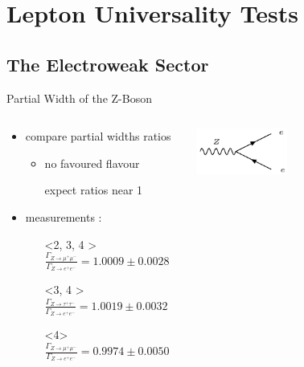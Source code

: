 \section{Lepton Universality Tests}
\subsection{The Electroweak Sector}
\frame{\tableofcontents[currentsection]}
    \begin{frame}{Partial Width of the Z-Boson}
        \begin{columns}
            \begin{column}{0.5\textwidth}
                \begin{itemize}
                    \item compare partial widths \rightarrow ratios
                    \begin{itemize}
                        \item no favoured flavour
                        \item [\rightarrow] expect ratios near 1
                    \end{itemize} 
                    \item measurements \footnotemark{} \footnotemark{} :
                    \begin{itemize}
                        \item [] <2, 3, 4 >$\frac{\Gamma_{Z \rightarrow \mu^+ \mu^-}}{\Gamma_{Z \rightarrow e^+ e^-}} = 1.0009 \pm 0.0028$
                        \item  []
                        \item [] <3, 4 > $\frac{\Gamma_{Z \rightarrow \tau^+ \tau^-}}{\Gamma_{Z \rightarrow e^+ e^-}} = 1.0019 \pm 0.0032$
                        \item []
                        \item [] <4>$\frac{\Gamma_{Z \rightarrow \mu^+ \mu^-}}{\Gamma_{Z \rightarrow e^+ e^-}} = 0.9974 \pm 0.0050$
                    \end{itemize}
                \end{itemize}
            \end{column}
            \begin{column}{0.5\textwidth}
                \includegraphics[width = 0.42\textwidth]{content/images/Zdecay_ee.png} \\

\end{column}
\end{columns}
\end{frame}
